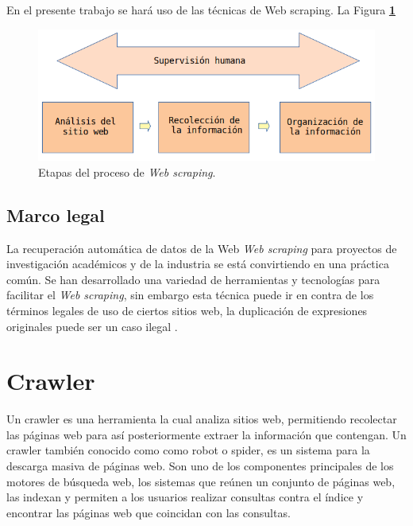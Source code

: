 En el presente trabajo se hará uso de las técnicas de Web scraping.
La Figura \textbf{\ref{fig:procesos}}

\begin{figure}[H]
    \centering
    \includegraphics[scale=.35]{imagenes/Capitulo5/procesos}
    \caption{Etapas del proceso de \textit{Web scraping}.}
    \label{fig:procesos}
  \end{figure}
  

\subsection{Marco legal}

La recuperación automática de datos de la Web \textit{Web scraping} para proyectos de investigación académicos y de la 
industria se está convirtiendo en una práctica común. Se han desarrollado una variedad de herramientas y tecnologías 
para facilitar el \textit{Web scraping}, sin embargo esta técnica puede ir en contra de los términos legales 
de uso de ciertos sitios web, la duplicación de expresiones originales puede ser un caso ilegal \citep{CTMarco}.


\section{Crawler}

Un crawler \citep{CT14} es una herramienta la cual analiza sitios web, permitiendo recolectar 
las páginas web para así posteriormente extraer la información que contengan. Un crawler también 
conocido como como robot o spider, es un sistema para la descarga masiva de páginas web. Son uno de 
los componentes principales de los motores de búsqueda web, los sistemas que reúnen un conjunto de 
páginas web, las indexan y permiten a los usuarios realizar consultas contra el índice y encontrar las 
páginas web que coincidan con las consultas.

